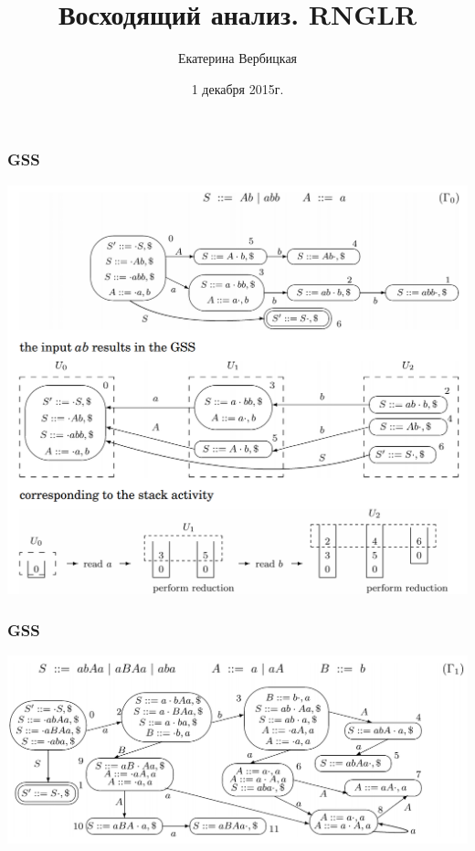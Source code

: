 \documentclass{beamer}
\title[]{Восходящий анализ. RNGLR}
\subtitle[]{}
\institute[]{
Санкт-Петербургский государственный университет \\
Математико-механический факультет }
\author[Екатерина Вербицкая]{Екатерина Вербицкая}
\date{1 декабря 2015г.}
\begin{document}
{
\begin{frame}[fragile]
  \titlepage
\end{frame}
}

\begin{frame}[fragile]
  \transwipe[direction=90]
  \frametitle{GSS}
\begin{center}
  \includegraphics[width=1.0\textwidth]{pics/1}
\end{center}                                      
\end{frame}

\begin{frame}[fragile]
  \transwipe[direction=90]
  \frametitle{GSS}
\begin{center}
  \includegraphics[width=1.0\textwidth]{pics/2}
\end{center}                                      
\end{frame}
\end{document}
